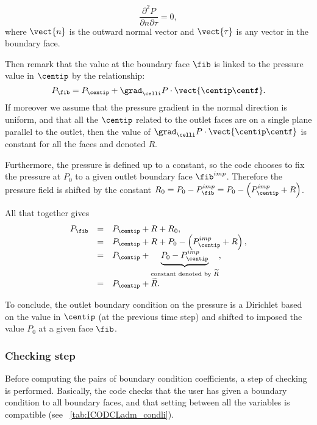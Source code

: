 \begin{equation*}
\displaystyle\frac{\partial^2 P}{\partial n \partial \tau } = 0,
\end{equation*}
where $\vect{n}$ is the outward normal vector and  $\vect{\tau}$ is any 
vector in the boundary face.

Then remark that the value at the boundary face $\fib$ is linked
to the pressure value in $\centip$ by the relationship:
\begin{equation*}
P_\fib = P_{\centip} +  \grad_\celli P \cdot \vect{\centip\centf}.
\end{equation*}
If moreover we assume that the pressure gradient in the normal direction
is uniform, and that all the $\centip$ related to the outlet faces are on 
a single plane parallel to the outlet, then the value of $ \grad_\celli P \cdot \vect{\centip\centf} $
is constant for all the faces and denoted $R$. 

Furthermore, the pressure is defined up to a constant, so the code
chooses to fix the pressure at $P_0$ to a given outlet boundary face 
$\fib^{imp}$. Therefore the pressure field is shifted  by the constant
$R_0=P_0- P_\fib^{imp} = P_0 - \left( P_{\centip}^{imp}+R \right)$.

All that together gives
\begin{equation}\label{Base_Condli_eq_psortie_condli}
\begin{array}{rcl}
P_\fib 
   &=& P_{\centip}+R+R_0,\\
   &=& P_{\centip}+R+P_0- \left( P_{\centip}^{imp}+R \right),\\
   &=&P_{\centip} +\underbrace{P_0-P_{\centip}^{imp}}_{\text{constant denoted by $\widetilde{R}$}} ,\\
   &=&P_{\centip} + \widetilde{R}.
\end{array}
\end{equation}

To conclude, the outlet boundary condition on the pressure is a Dirichlet based on 
the value in $\centip$ (at the previous time step) and shifted to imposed
the value $P_0$ at a given face $\fib$.

\subsubsection{Checking step}

 Before computing the pairs of boundary condition coefficients, a step of checking is performed. Basically, 
the code checks that the user has given a boundary condition to all boundary faces, and that 
setting between all the variables is compatible (see \tablename~\ref{tab:ICODCLadm_condli}).



